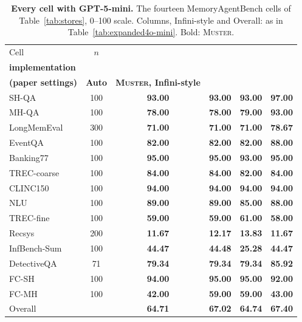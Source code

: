 \documentclass{article}
\newcommand{\tabfont}{\fontsize{7.5}{8.5}\selectfont\renewcommand{\arraystretch}{1.0}}
\newcommand{\sys}{\textsc{Muster}}
\begin{document}
\begin{table}[!htbp]
\centering\tabfont
\caption{\textbf{Every cell with GPT-5-mini.} The fourteen MemoryAgentBench cells of Table~\ref{tab:stores}, 0--100 scale. Columns, Infini-style and Overall: as in Table~\ref{tab:expanded4o-mini}. Bold: \sys{}.}
\label{tab:expanded5-mini}
\setlength{\tabcolsep}{4pt}\setlength{\aboverulesep}{0pt}\setlength{\belowrulesep}{0pt}\setlength{\extrarowheight}{0.8pt}
\begin{tabular}{lc>{\columncolor{oursbg}}c>{\columncolor{oursbg}}c>{\columncolor{oursbg}}c>{\columncolor{oursbg}}c}
\toprule
Cell & $n$ & \shortstack{\textbf{Original}\\\textbf{implementation}} & \shortstack{\textbf{SDK}\\\textbf{(paper settings)}} & \textbf{Auto} & \textbf{\sys{}, Infini-style} \\
\midrule
SH-QA & 100 & \textbf{93.00} & \textbf{93.00} & \textbf{93.00} & \textbf{97.00} \\
MH-QA & 100 & \textbf{78.00} & \textbf{78.00} & \textbf{79.00} & \textbf{93.00} \\
LongMemEval & 300 & \textbf{71.00} & \textbf{71.00} & \textbf{71.00} & \textbf{78.67} \\
EventQA & 100 & \textbf{82.00} & \textbf{82.00} & \textbf{82.00} & \textbf{88.00} \\
Banking77 & 100 & \textbf{95.00} & \textbf{95.00} & \textbf{93.00} & \textbf{95.00} \\
TREC-coarse & 100 & \textbf{84.00} & \textbf{84.00} & \textbf{82.00} & \textbf{84.00} \\
CLINC150 & 100 & \textbf{94.00} & \textbf{94.00} & \textbf{94.00} & \textbf{94.00} \\
NLU & 100 & \textbf{89.00} & \textbf{89.00} & \textbf{85.00} & \textbf{88.00} \\
TREC-fine & 100 & \textbf{59.00} & \textbf{59.00} & \textbf{61.00} & \textbf{58.00} \\
Recsys & 200 & \textbf{11.67} & \textbf{12.17} & \textbf{13.83} & \textbf{11.67} \\
InfBench-Sum & 100 & \textbf{44.47} & \textbf{44.48} & \textbf{25.28} & \textbf{44.47} \\
DetectiveQA & 71 & \textbf{79.34} & \textbf{79.34} & \textbf{79.34} & \textbf{85.92} \\
FC-SH & 100 & \textbf{94.00} & \textbf{95.00} & \textbf{95.00} & \textbf{92.00} \\
FC-MH & 100 & \textbf{42.00} & \textbf{59.00} & \textbf{59.00} & \textbf{43.00} \\
\midrule
Overall &  & \textbf{64.71} & \textbf{67.02} & \textbf{64.74} & \textbf{67.40} \\
\bottomrule
\end{tabular}
\end{table}
\end{document}
